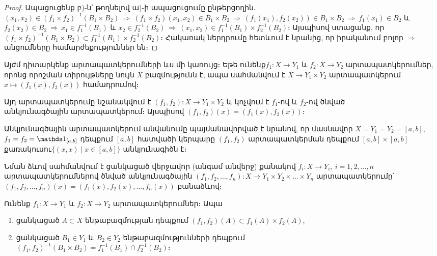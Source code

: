 \documentclass[./main.tex]{subfiles}
\begin{document}
\begin{proof}
Ապացուցենք բ)-ն՝ թողնելով ա)-ի ապացուցումը ընթերցողին․\\
$(x_1,x_2)\in (f_1\times f_2)^{-1}(B_1\times B_2)\ \Rightarrow \ (f_1 \times f_2)(x_1,x_2)\in B_1 \times B_2\ \Rightarrow\ (f_1(x_1),f_2(x_2)) \in B_1\times B_2\ \Rightarrow\ f_1(x_1) \in B_2 $ և $f_2(x_2)\in B_2\ \Rightarrow\ x_1 \in f_1^{-1}(B_1)$ և $x_2 \in f_2^{-1}(B_2)\ \Rightarrow\ (x_1,x_2)\in f_1^{-1}(B_1)\times f_2^{-1}(B_2)$։
Այսպիսով ստացանք, որ $(f_1\times f_2)^{-1}(B_1\times B_2) \subset f_1^{-1}(B_1)\times f_2^{-1}(B_2) $։ Հակառակ ներդրումը հետևում է նրանից, որ իրականում բոլոր $\Rightarrow$ անցումները հա\-մար\-ժե\-քու\-թյուն\-ներ են։
\end{proof} 
\par Այժմ դիտարկենք արտապատկերումների ևս մի կառույց։ Եթե ունենք\linebreak $f_1:X \rightarrow Y_1$ և $f_2:X\rightarrow Y_2 $ արտապատկերումներ, որոնց որոշման տիրույթները նույն $X$ բազմությունն է, ապա սահմանվում է $X \rightarrow Y_1 \times Y_2$ արտապատկերում $x \mapsto (f_1(x),f_2(x))$ համադրումով։
\par Այդ արտապատկերումը նշանակվում է $(f_1,f_2):X\rightarrow Y_1 \times Y_2$ և կոչվում է $f_1\textrm{-ով}$ և $f_2$-ով ծնված $\textbf{անկյունագծային արտապատկերում}$։ Այս\-պի\-սով $(f_1,f_2)(x)=(f_1(x),f_2(x))$։ 
\par Անկյունագծային արտապատկերում անվանումը պայմանավորված է նրանով, որ մասնավոր $X=Y_1=Y_2=[a,b]$, $f_1=f_2=\nuynakan_{[a,b]}$ դեպքում $[a,b]$ հատվածի կերպարը $(f_1,f_2)$ արտապատկերման դեպքում $[a,b]\times [a,b]$ քառակուսու\linebreak $\{(x,x)\mid x\in [a,b]\}$ անկյունագիծն է։
\par Նման ձևով սահմանվում է ցանկացած վերջավոր (անգամ անվերջ) քանակով $f_i:X\rightarrow Y_i,\ i=1,2,\dots ,n$ ար\-տա\-պատ\-կեր\-ում\-նե\-րով ծնված անկյունագծային $(f_1,f_2,\dots ,f_n):X\rightarrow Y_1 \times Y_2 \times \dots \times Y_n$ արտապատկերումը՝ $(f_1,f_2,\dots ,f_n)(x)=(f_1(x),f_2(x),\dots ,f_n(x))$ բանաձևով։
\begin{theorem}\label{ch2thm4} 
Ունենք $f_1:X\rightarrow Y_1$ և $f_2:X\rightarrow Y_2$ արտապատկերումներ։ Ապա
\begin{enumerate}
    \item[ա)] ցանկացած $A\subset X$ ենթաբազմության դեպքում $(f_1,f_2)(A)\subset f_1(A)\times f_2(A)$,
    \item[բ)] ցանկացած $B_1\in Y_1$ և $B_2 \in Y_2$ ենթաբազմությունների դեպքում \\
$(f_1,f_2)^{-1}(B_1\times B_2)=f_1^{-1}(B_1)\cap f_2^{-1}(B_2)$։
\end{enumerate}
\end{theorem}
\end{document}
